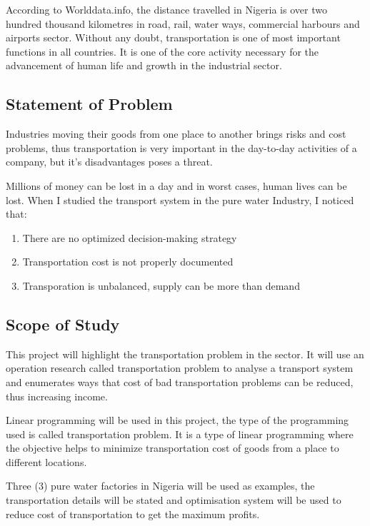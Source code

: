 \documentclass{article}
\begin{document}
{According to Worlddata.info, the distance travelled in Nigeria is over two hundred thousand kilometres in road, rail, water ways, commercial harbours and airports sector. Without any doubt, transportation is one of most important functions in all countries. It is one of the core activity necessary for the advancement of human life and growth in the industrial sector.}

\newpage

\begin{center}
\subsection{Statement of Problem}
\end{center}
{\large Industries moving their goods from one place to another brings risks and cost problems, thus transportation is very important in the day-to-day activities of a company, but it's disadvantages poses a threat.

Millions of money can be lost in a day and in worst cases, human lives can be lost. When I studied the transport system in the pure water Industry, I noticed that:
\newline
\begin{enumerate}

\item There are no optimized decision-making strategy

\item Transportation cost is not properly documented

\item Transporation is unbalanced, supply can be more than demand

\end{enumerate}}

\newpage

\begin{center}
	\subsection{Scope of Study}
\end{center}
{\large This project will highlight the transportation problem in the sector. It will use an operation research called transportation problem to analyse a transport system and enumerates ways that cost of bad transportation problems can be reduced, thus increasing income.

Linear programming will be used in this project, the type of the programming used is called transportation problem. It is a type of linear programming where the objective helps to minimize transportation cost of goods from a place to different locations.

Three (3) pure water factories in Nigeria will be used as examples, the transportation details will be stated and optimisation system will be used to reduce cost of transportation to get the maximum profits.}
\end{document}
